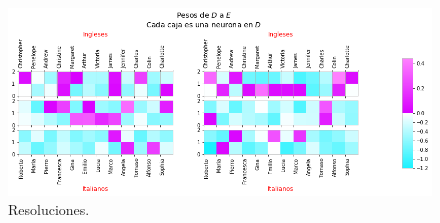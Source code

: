     \begin{figure}[h]
   \centering
   \includegraphics[scale=.5]{../Figuras/Hinton/r3.png}
   \caption{Resoluciones.}
  \label{fig:r3}
  \end{figure}

  
 
 
